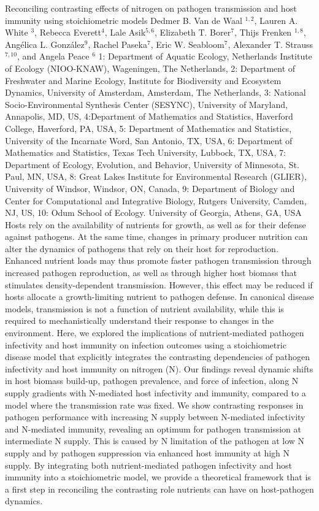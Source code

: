 \begin{addmargin}[2em]{0em}
\vspace{1.5ex}
\abs
{Reconciling contrasting effects of nitrogen on pathogen transmission and host immunity using stoichiometric models }
{ Dedmer B. Van de Waal $^{1,2}$, Lauren A. White $^{3}$, Rebecca Everett$^{4}$, Lale Asik$^{5,6}$, Elizabeth T. Borer$^{7}$, Thijs Frenken $^{1,8}$, Angélica L. González$^{9}$, Rachel Paseka$^{7}$, Eric W. Seabloom$^{7}$, Alexander T. Strauss $^{7,10}$, and Angela Peace $^{6}$}
{1: Department of Aquatic Ecology, Netherlands Institute of Ecology (NIOO-KNAW), Wageningen, The Netherlands, 2: Department of Freshwater and Marine Ecology, Institute for Biodiversity and Ecosystem Dynamics, University of Amsterdam, Amsterdam, The Netherlands, 3: National Socio-Environmental Synthesis Center (SESYNC), University of Maryland, Annapolis, MD, US, 4:Department of Mathematics and Statistics, Haverford College, Haverford, PA, USA, 5: Department of Mathematics and Statistics, University of the Incarnate Word, San Antonio, TX, USA, 6: Department of Mathematics and Statistics, Texas Tech University, Lubbock, TX, USA, 7: Department of Ecology, Evolution, and Behavior, University of Minnesota, St. Paul, MN, USA, 8: Great Lakes Institute for Environmental Research (GLIER), University of Windsor, Windsor, ON, Canada, 9: Department of Biology and Center for Computational and Integrative Biology, Rutgers University, Camden, NJ, US, 10: Odum School of Ecology. University of Georgia, Athens, GA, USA}
{Hosts rely on the availability of nutrients for growth, as well as for their defense against pathogens. At the same time, changes in primary producer nutrition can alter the dynamics of pathogens that rely on their host for reproduction. Enhanced nutrient loads may thus promote faster pathogen transmission through increased pathogen reproduction, as well as through higher host biomass that stimulates density-dependent transmission. However, this effect may be reduced if hosts allocate a growth-limiting nutrient to pathogen defense. In canonical disease models, transmission is not a function of nutrient availability, while this is required to mechanistically understand their response to changes in the environment. Here, we explored the implications of nutrient-mediated pathogen infectivity and host immunity on infection outcomes using a stoichiometric disease model that explicitly integrates the contrasting dependencies of pathogen infectivity and host immunity on nitrogen (N). Our findings reveal dynamic shifts in host biomass build-up, pathogen prevalence, and force of infection, along N supply gradients with N-mediated host infectivity and immunity, compared to a model where the transmission rate was fixed. We show contrasting responses in pathogen performance with increasing N supply between N-mediated infectivity and N-mediated immunity, revealing an optimum for pathogen transmission at intermediate N supply. This is caused by N limitation of the pathogen at low N supply and by pathogen suppression via enhanced host immunity at high N supply. By integrating both nutrient-mediated pathogen infectivity and host immunity into a stoichiometric model, we provide a theoretical framework that is a first step in reconciling the contrasting role nutrients can have on host-pathogen dynamics.}



\end{addmargin}
